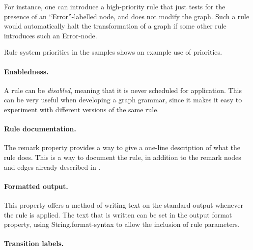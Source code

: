 For instance, one can introduce a high-priority rule that just tests for the
presence of an ``\textsf{Error}''-labelled node, and does not modify the
graph. Such a rule would automatically halt the transformation of a graph if
some other rule introduces such an \textsf{Error}-node.

Rule system \textsf{priorities} in the \GROOVE{} samples shows an example use
of priorities.

%

\paragraph{Enabledness.}

A rule can be \emph{disabled}, meaning that it is never scheduled for
application. This can be very useful when developing a graph grammar, since it
makes it easy to experiment with different versions of the same rule.

\paragraph{Rule documentation.}

The \textsf{remark} property provides a way to give a one-line description of
what the rule does. This is a way to document the rule, in addition to the
remark nodes and edges already described in .

\paragraph{Formatted output.}

This property offers a method of writing text on the standard output whenever
the rule is applied. The text that is written can be set in the \textsf{output
format} property, using \textsf{String.format}-syntax to allow the inclusion of
rule parameters.

\paragraph{Transition labels.}

